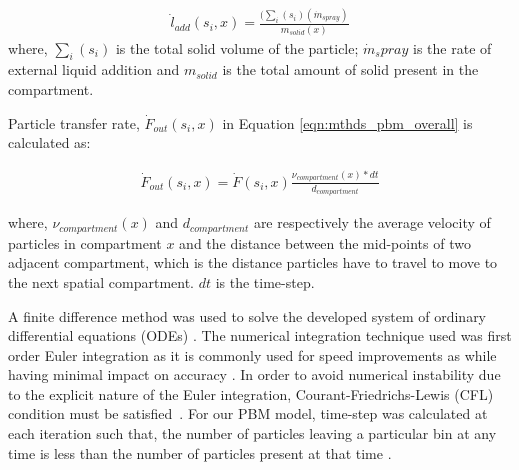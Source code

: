 \documentclass[preprint,10pt,authoryear,review]{elsarticle}
\begin{document}
\begin{align}
\dot{l}_{add}(s_i,x) = \frac{(\sum_i(s_i)(\dot{m}_{spray})}{m_{solid}(x)}
\label{eqn:mthds_liq_addn_rate}
\end{align}
where, $\sum_i(s_i)$  is the total solid volume of the particle; $\dot{m}_spray$ is the 
rate of external liquid addition and $m_{solid}$ is the total amount of solid present in the compartment.
%
%
%

Particle transfer rate, $\dot{F}_{out}(s_i,x)$ in Equation \ref{eqn:mthds_pbm_overall} 
is calculated as:

\begin{align}
\dot{F}_{out}(s_i,x) = \dot{F}(s_i,x)\frac{\nu_{compartment}(x)*dt}{d_{compartment}}
\label{eqn:mthds_f_out_dot_part_trans_rate}
\end{align}

where, $\nu_{compartment}(x)$ and $d_{compartment}$ are respectively the average 
velocity of particles in compartment $x$ and the distance between the mid-points 
of two adjacent compartment, which is the distance particles have to travel to 
move to the next spatial compartment. $dt$ is the time-step.

A finite difference method was used to solve the developed system of ordinary differential 
equations (ODEs) \citep{Barrasso2015cerd}. The numerical integration technique used 
was first order Euler integration as it is commonly used for speed improvements as while 
having minimal impact on accuracy \citep{Barrasso2013}. In order to avoid numerical 
instability due to the explicit nature of the Euler integration, Courant-Friedrichs-Lewis 
(CFL) condition must be satisfied~\citep{courant1967}. For our PBM model, time-step was 
calculated at each iteration such that, the number of particles leaving a particular bin 
at any time is less than the number of particles present at that time \citep{Ramachandran2010}.
\end{document}
